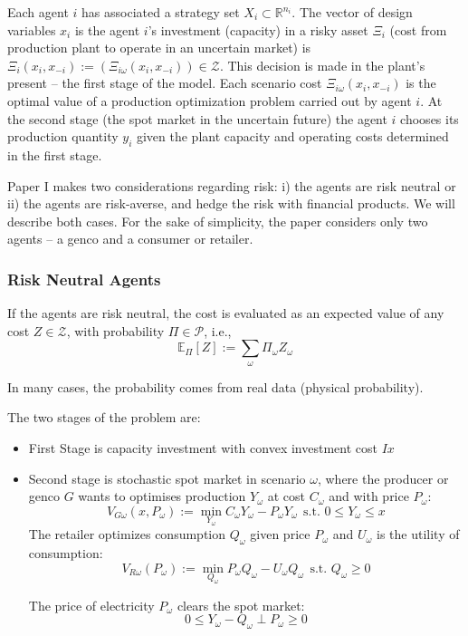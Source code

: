 \documentclass[11pt, letterpaper]{article}
\begin{document}
Each agent $i$ has associated a strategy set $X_i \subset \mathbb{R}^{n_i}$. The vector of design variables $x_i$ is the agent $i$'s investment (capacity)  in a risky asset $\Xi_i$ (cost from production plant to operate in an uncertain market) is $\Xi_i(x_i,x_{-i}):= (\Xi_{i\omega}(x_i, x_{-i})) \in \mathcal{Z}$. This decision is made in the plant's present -- the first stage of the model. Each scenario cost $\Xi_{i\omega}(x_i, x_{-i})$ is the optimal value of a production optimization problem carried out by agent $i$. At the second stage (the spot market in the uncertain future) the agent $i$ chooses its production quantity $y_i$ given the plant capacity and operating costs determined in the first stage. 
\smallskip

Paper I makes two considerations regarding risk: i) the agents are risk neutral or ii) the agents are risk-averse, and hedge the risk with financial products. We will describe both cases. For the sake of simplicity, the paper considers only two agents -- a genco and a consumer or retailer.

\subsubsection{Risk Neutral Agents}
If the agents are risk neutral, the cost is evaluated as an expected value of any cost $Z \in \mathcal{Z}$, with probability $\Pi \in \mathcal{P}$, i.e.,
\begin{equation}
     \mathbb{E}_{\Pi}[Z]:= \sum_{\omega} \Pi_{\omega}Z_{\omega}
\end{equation}

In many cases, the probability comes from real data (physical probability). 
\smallskip

The two stages of the problem are:

\begin{itemize}
    \item First Stage is capacity investment with convex investment cost $Ix$
    \item Second stage is stochastic spot market in scenario $\omega$, where the producer or genco $G$ wants to optimises production $Y_\omega$ at cost $C_\omega$ and with price $P_\omega$:
    \begin{equation}
         V_{G\omega}(x, P_\omega):= \min_{Y_\omega} C_\omega Y_\omega - P_\omega Y_\omega \ \ \textrm{s.t. \ \ } 0 \leq Y_\omega \leq x
    \end{equation}
    The retailer optimizes consumption $Q_\omega$ given price $P_\omega$ and $U_\omega$ is the utility of consumption:
    \begin{equation}\label{eq:RN_Rspot}
        V_{R \omega} (P_\omega):= \min_{Q_\omega} P_\omega Q_\omega - U_\omega Q_\omega \ \ \textrm{s.t. \ \ } Q_\omega \geq 0 
    \end{equation}
    
    
The price of electricity $P_\omega$ clears the spot market:
    \begin{equation}\label{eq:mccRN}
        0 \leq Y_\omega - Q_\omega \perp P_\omega \geq 0
    \end{equation}
    
\end{itemize}
\end{document}
